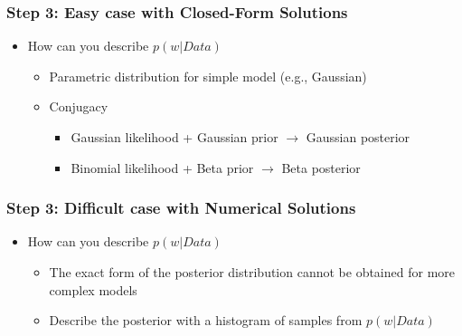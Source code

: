 \documentclass[10pt]{article}
\begin{document}
\subsubsection*{Step 3: Easy case with Closed-Form Solutions}
\begin{itemize}
	\item How can you describe $p(w | Data)$
	\begin{itemize}
	    \item Parametric distribution for simple model (e.g., Gaussian)
	    \item Conjugacy
	    \begin{itemize}
	        \item Gaussian likelihood + Gaussian prior $\rightarrow$ Gaussian posterior
	        \item Binomial likelihood + Beta prior $\rightarrow$ Beta posterior
        \end{itemize}
    \end{itemize}
\end{itemize}

\subsubsection*{Step 3: Difficult case with Numerical Solutions}
\begin{itemize}
	\item How can you describe $p(w | Data)$
	\begin{itemize}
	    \item The exact form of the posterior distribution cannot be obtained for more complex models
	    \item Describe the posterior with a histogram of samples from $p(w | Data)$
    \end{itemize}
\end{itemize}
\end{document}
